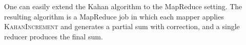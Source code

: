 


One can easily extend the Kahan algorithm to the MapReduce setting. 
The resulting algorithm %
is a MapReduce job in which each mapper applies \textsc{KahanIncrement} and generates a partial sum with correction, and a single reducer produces the final sum. %

